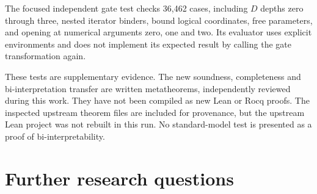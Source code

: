 \documentclass[11pt]{article}
\theoremstyle{definition}
\theoremstyle{remark}
\begin{document}
The focused independent gate test checks 36,462 cases, including $D$
depths zero through three, nested iterator binders, bound logical
coordinates, free parameters, and opening at numerical arguments zero,
one and two. Its evaluator uses explicit environments and does not
implement its expected result by calling the gate transformation again.

These tests are supplementary evidence. The new soundness,
completeness and bi-interpretation transfer are written metatheorems,
independently reviewed during this work. They have not been compiled
as new Lean or Rocq proofs. The inspected upstream theorem files are
included for provenance, but the upstream Lean project was not rebuilt
in this run. No standard-model test is presented as a proof of
bi-interpretability.

\section{Further research questions}
\end{document}
